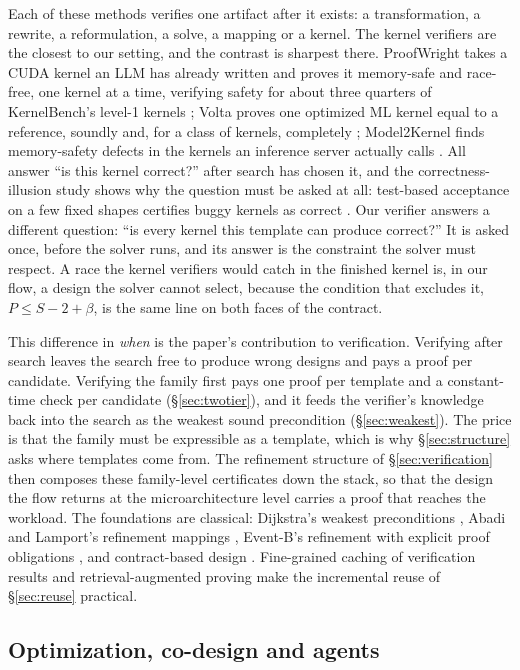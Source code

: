 \documentclass[11pt]{article}
\begin{document}
Each of these methods verifies one artifact after it exists: a transformation, a rewrite, a reformulation, a solve, a mapping or a kernel. The kernel verifiers are the closest to our setting, and the contrast is sharpest there. ProofWright takes a CUDA kernel an LLM has already written and proves it memory-safe and race-free, one kernel at a time, verifying safety for about three quarters of KernelBench's level-1 kernels \cite{r103}; Volta proves one optimized ML kernel equal to a reference, soundly and, for a class of kernels, completely \cite{r104}; Model2Kernel finds memory-safety defects in the kernels an inference server actually calls \cite{r106}. All answer ``is this kernel correct?'' after search has chosen it, and the correctness-illusion study shows why the question must be asked at all: test-based acceptance on a few fixed shapes certifies buggy kernels as correct \cite{r105}. Our verifier answers a different question: ``is every kernel this template can produce correct?'' It is asked once, before the solver runs, and its answer is the constraint the solver must respect. A race the kernel verifiers would catch in the finished kernel is, in our flow, a design the solver cannot select, because the condition that excludes it, \(P\le S-2+\beta\), is the same line on both faces of the contract.

This difference in \emph{when} is the paper's contribution to verification. Verifying after search leaves the search free to produce wrong designs and pays a proof per candidate. Verifying the family first pays one proof per template and a constant-time check per candidate (§\ref{sec:twotier}), and it feeds the verifier's knowledge back into the search as the weakest sound precondition (§\ref{sec:weakest}). The price is that the family must be expressible as a template, which is why §\ref{sec:structure} asks where templates come from. The refinement structure of §\ref{sec:verification} then composes these family-level certificates down the stack, so that the design the flow returns at the microarchitecture level carries a proof that reaches the workload. The foundations are classical: Dijkstra's weakest preconditions \cite{r12}, Abadi and Lamport's refinement mappings \cite{r37}, Event-B's refinement with explicit proof obligations \cite{r38}, and contract-based design \cite{r39}. Fine-grained caching of verification results \cite{r50,r51} and retrieval-augmented proving \cite{r52} make the incremental reuse of §\ref{sec:reuse} practical.

\subsection{Optimization, co-design and agents}
\end{document}
